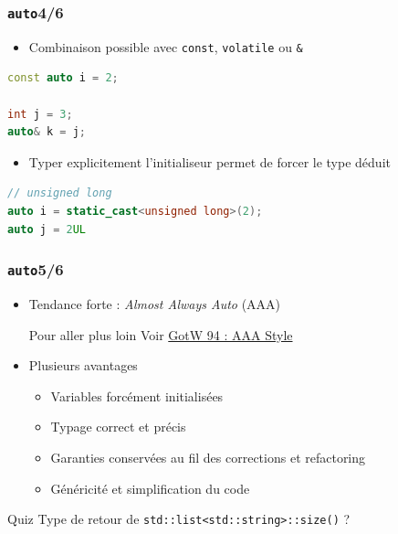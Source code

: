 \documentclass[C++.tex]{subfiles}
\begin{document}
\begin{frame}[fragile]
	\frametitle{\lstinline|auto|\titlehfill{}4/6}
	\begin{itemize}
		\item Combinaison possible avec \lstinline|const|, \lstinline|volatile| ou \lstinline|&|
	\end{itemize}

	\begin{lstlisting}[language=C++]
const auto i = 2;

int j = 3;
auto& k = j;\end{lstlisting}

	\begin{itemize}
		\item Typer explicitement l'initialiseur permet de forcer le type déduit
	\end{itemize}

	\begin{lstlisting}[language=C++]
// unsigned long
auto i = static_cast<unsigned long>(2);
auto j = 2UL\end{lstlisting}
\end{frame}

\begin{frame}[fragile]
	\frametitle{\lstinline|auto|\titlehfill{}5/6}
	\begin{itemize}
		\item Tendance forte : \textit{Almost Always Auto} (AAA)

		\begin{block}{Pour aller plus loin}
			Voir \href{https://herbsutter.com/2013/08/12/gotw-94-solution-aaa-style-almost-always-auto/}{GotW 94 : AAA Style}
		\end{block}

		\item Plusieurs avantages
		\begin{itemize}
			\item Variables forcément initialisées
			\item Typage correct et précis
			\item Garanties conservées au fil des corrections et refactoring
			\item Généricité et simplification du code
		\end{itemize}
	\end{itemize}

	\pause
	
	\begin{block}{Quiz}
		Type de retour de \lstinline|std::list<std::string>::size()| ?
	\end{block}
\end{frame}
\end{document}
